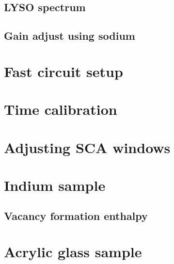 \documentclass[11pt, english, fleqn, DIV=15, headinclude, BCOR=2cm]{scrreprt}
\begin{document}
\subsection{LYSO spectrum}

\subsection{Gain adjust using sodium}

\section{Fast circuit setup}

\section{Time calibration}

\section{Adjusting SCA windows}

\section{Indium sample}

\subsection{Vacancy formation enthalpy}

\section{Acrylic glass sample}
\end{document}
